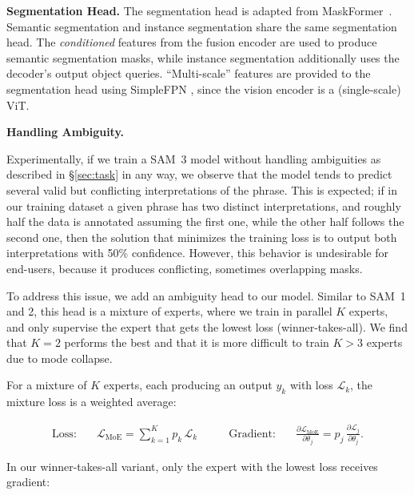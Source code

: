 \documentclass[]{fairmeta}
\newcommand{\samone}{SAM~1\xspace}
\newcommand{\model}{SAM~3\xspace}
\renewcommand{\paragraph}[1]{%
	\noindent\textbf{#1.}\noindent\xspace%
}
\begin{document}
\paragraph{Segmentation Head} The segmentation head is adapted from MaskFormer~\citep{cheng2021maskformer}. Semantic segmentation and instance segmentation share the same segmentation head. The \textit{conditioned} features from the fusion encoder are used to produce semantic segmentation masks, while instance segmentation additionally uses the decoder's output object queries. ``Multi-scale'' features are provided to the segmentation head using SimpleFPN \citep{vitdet}, since the vision encoder is a (single-scale) ViT.


\paragraph{Handling Ambiguity}
Experimentally, if we train a \model model without handling ambiguities as described in \S\ref{sec:task} in any way, we observe that the model tends to predict several valid but conflicting interpretations of the phrase. This is expected; if in our training dataset a given phrase has two distinct interpretations, and roughly half the data is annotated assuming the first one, while the other half follows the second one, then the solution that minimizes the training loss is to output both interpretations with 50\% confidence.
However, this behavior is undesirable for end-users, because it produces conflicting, sometimes overlapping masks.


To address this issue, we add an ambiguity head to our model. Similar to \samone and 2, this head is a mixture of experts, where we train in parallel $K$ experts, and only supervise the expert that gets the lowest loss (winner-takes-all). We find that $K = 2$ performs the best and that it is more difficult to train $K > 3$ experts due to mode collapse. %

For a mixture of $K$ experts, each producing an output $y_k$ with loss $\mathcal{L}_k$, the mixture loss is a weighted average:

\[
\begin{aligned}
	\text{Loss:} \quad 
	& \mathcal{L}_{\text{MoE}} = \sum_{k=1}^K p_k \, \mathcal{L}_k
	& \quad\quad
	\text{Gradient:} \quad 
	& \frac{\partial \mathcal{L}_{\text{MoE}}}{\partial \theta_j} 
	= p_j \, \frac{\partial \mathcal{L}_j}{\partial \theta_j}.
\end{aligned}
\]

In our winner-takes-all variant, only the expert with the lowest loss receives gradient:
\end{document}
